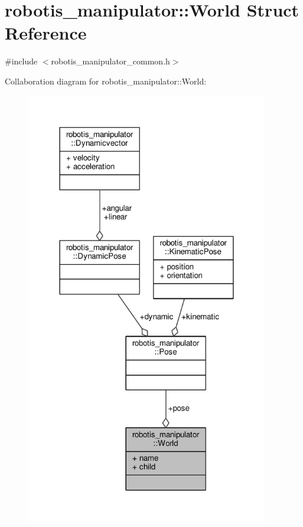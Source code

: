 \hypertarget{structrobotis__manipulator_1_1_world}{}\section{robotis\+\_\+manipulator\+:\+:World Struct Reference}
\label{structrobotis__manipulator_1_1_world}


{\ttfamily \#include $<$robotis\+\_\+manipulator\+\_\+common.\+h$>$}



Collaboration diagram for robotis\+\_\+manipulator\+:\+:World\+:\nopagebreak
\begin{figure}[H]
\begin{center}
\leavevmode
\includegraphics[width=300pt]{structrobotis__manipulator_1_1_world__coll__graph}
\end{center}
\end{figure}
